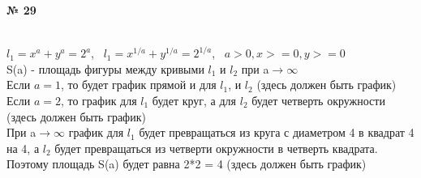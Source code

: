 \documentclass{article}
\begin{document}
\textbf{№ 29} 

\begingroup
\vspace{5mm}
\\
$ l_1 = x^a + y^a = 2^a $, \
$ l_1 = x^{1/a} + y^{1/a} = 2^{1/a} $, \
$ a>0, x>=0, y>=0$
\vspace{5mm}
\\
S(a) - площадь фигуры между кривыми $l_1$ и $l_2$ при a$\to \infty$
\vspace{5mm}
\\
Если $a = 1$, то будет график прямой и для $l_1$, и $l_2$ (здесь должен быть график)
\\
Если $a = 2$, то график для $l_1$ будет круг, а для $l_2$ будет четверть окружности (здесь должен быть график)
\vspace{5mm}
\\
При a$\to \infty$ график для $l_1$ будет превращаться из круга с диаметром 4 в квадрат 4 на 4, а $l_2$ будет превращаться из четверти окружности в четверть квадрата. Поэтому площадь S(a) будет равна 2*2 = 4 (здесь должен быть график)

\endgroup
\end{document}
